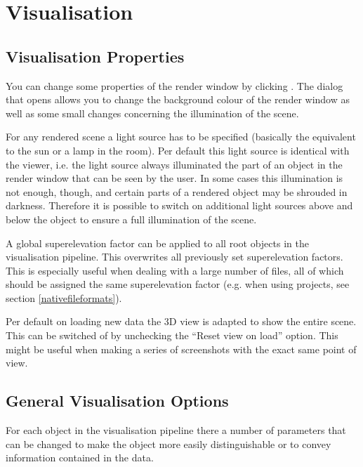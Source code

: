 \chapter{Visualisation}

\section{Visualisation Properties}

You can change some properties of the render window by clicking  . The dialog that opens allows you to change the background colour of the render window as well as some small changes concerning the illumination of the scene.

For any rendered scene a light source has to be specified (basically the equivalent to the sun or a lamp in the room). Per default this light source is identical with the viewer, i.e. the light source always illuminated the part of an object in the render window that can be seen by the user. In some cases this illumination is not enough, though, and certain parts of a rendered object may be shrouded in darkness. Therefore it is possible to switch on additional light sources above and below the object to ensure a full illumination of the scene.

A global superelevation factor can be applied to all root objects in the visualisation pipeline. This overwrites all previously set superelevation factors. This is especially useful when dealing with a large number of files, all of which should be assigned the same superelevation factor (e.g. when using \ogs projects, see section \ref{nativefileformats}).

Per default on loading new data the 3D view is adapted to show the entire scene. This can be switched of by unchecking the ``Reset view on load'' option. This might be useful when making a series of screenshots with the exact same point of view.

\section{General Visualisation Options}
\label{genvisoptions}

For each object in the visualisation pipeline there a number of parameters that can be changed to make the object more easily distinguishable or to convey information contained in the data.

